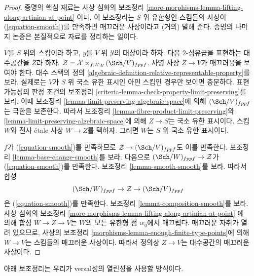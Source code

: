 \begin{proof}
증명의 핵심 재료는 사상 심화의 보조정리
\ref{more-morphisms-lemma-lifting-along-artinian-at-point}
이다. 이 보조정리는 $S$ 위 유한형인 스킴들의 사상이
(\ref{equation-smooth})를 만족하면 매끄러운 사상이라고 (거의)
말해 준다. 증명의 나머지 논증은 본질적으로 자료를 정리하는 일이다.

\medskip\noindent
$V$를 $S$ 위의 스킴이라 하고, $y$를 $V$ 위 $\mathcal{Y}$의 대상이라 하자.
다음 $2$-섬유곱을 표현하는 대수공간을 $Z$라 하자.
$\mathcal{Z} = \mathcal{X} \times_{f, \mathcal{X}, y} (\Sch/V)_{fppf}$.
사영 사상 $Z \to V$가 매끄러움을 보여야 한다. 대수 스택의
정의 \ref{algebraic-definition-relative-representable-property}를 보라.
실제로는 $V$가 $S$ 위 국소 유한 표시인 아핀 스킴인 경우만 보이면
충분하다. 표현 가능성의 판정 조건의 보조정리
\ref{criteria-lemma-check-property-limit-preserving}를 보라.
이때 보조정리 \ref{lemma-limit-preserving-algebraic-space}에 의해
$(\Sch/V)_{fppf}$는 극한을 보존한다. 따라서 보조정리
\ref{lemma-fibre-product-limit-preserving}와
\ref{lemma-limit-preserving-algebraic-space}에 의해 $Z \to S$는
국소 유한 표시이다. 스킴 $W$와 전사 \'etale 사상 $W \to Z$를 택하자.
그러면 $W$는 $S$ 위 국소 유한 표시이다.

\medskip\noindent
$f$가 (\ref{equation-smooth})를 만족하므로
$\mathcal{Z} \to (\Sch/V)_{fppf}$도 이를 만족한다.
보조정리 \ref{lemma-base-change-smooth}를 보라. 다음으로
$(\Sch/W)_{fppf} \to \mathcal{Z}$가 (\ref{equation-smooth})를 만족한다.
보조정리 \ref{lemma-smooth-smooth}를 보라. 따라서 합성
$$
(\Sch/W)_{fppf} \to \mathcal{Z} \to (\Sch/V)_{fppf}
$$
은 (\ref{equation-smooth})를 만족한다.
보조정리 \ref{lemma-composition-smooth}를 보라. 사상 심화의 보조정리
\ref{more-morphisms-lemma-lifting-along-artinian-at-point}
에 의해 합성 $W \to Z \to V$는 $W$의 모든 유한형 점 $w_0$에서
매끄럽다. 매끄러운 자취가 열려 있으므로, 사상의 보조정리
\ref{morphisms-lemma-enough-finite-type-points}에 의해 $W \to V$는
스킴들의 매끄러운 사상이다. 따라서 정의상 $Z \to V$는 대수공간의
매끄러운 사상이다.
\end{proof}

\noindent
아래 보조정리는 우리가 versal성의 열린성을 사용할 방식이다.

